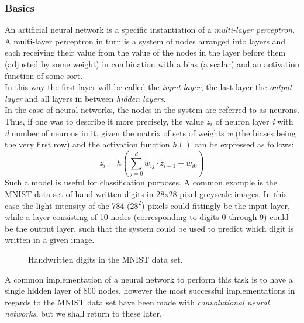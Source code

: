 \subsubsection{Basics}
An artificial neural network is a specific instantiation of a \textit{multi-layer perceptron}.
A multi-layer perceptron in turn is a system of nodes arranged into layers and each receiving their value from the value of the nodes in the layer before them (adjusted by some weight) in combination with a bias (a scalar) and an activation function of some sort. \\
In this way the first layer will be called the \textit{input layer}, the last layer the \textit{output layer} and all layers in between \textit{hidden layers}. \\
In the case of neural networks, the nodes in the system are referred to as neurons.
Thus, if one was to describe it more precisely, the value $z_i$ of neuron layer \textit{i} with \textit{d} number of neurons in it, given the matrix of sets of weights \textit{w} (the biases being the very first row) and the activation function $h()$ can be expressed as follows:
\[
z_i = h\left(\sum_{j=0}^d w_{ij}\cdot z_{i-1} + w_{i0}\right)
\]
Such a model is useful for classification purposes. A common example is the MNIST data set of hand-written digits in 28x28 pixel greyscale images. In this case the light intensity of the 784 ($28^2$) pixels could fittingly be the input layer, while a layer consisting of 10 nodes (corresponding to digits 0 through 9) could be the output layer, such that the system could be used to predict which digit is written in a given image.
\begin{figure}[h]
  \centering
  \caption{Handwritten digits in the MNIST data set.}
\end{figure}
A common implementation of a neural network to perform this task is to have a single hidden layer of 800 nodes, however the most successful implementations in regards to the MNIST data set have been made with \textit{convolutional neural networks}, but we shall return to these later.

